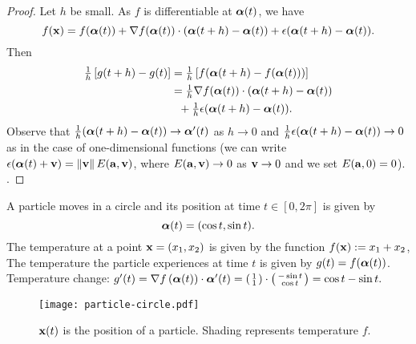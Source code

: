 \begin{proof}
    Let \(h\) be small. As $f$ is differentiable at $\aalpha(t)$,
    we have
    \[
     f(\xx) = f(\aalpha(t)) + \nabla f(\aalpha(t)) \cdot (\aalpha(t+h) - \aalpha(t)) + \epsilon(\aalpha(t+h)-\aalpha(t)).
    \]
    Then
    \[
        \begin{aligned}
            \tfrac{1}{h}\left[g(t+h)-g(t) \right]
             & = \tfrac{1}{h}\left[f(\aalpha(t+h)-f(\aalpha(t)))\right]                        \\
             & = \tfrac{1}{h} \nabla f(\aalpha(t))\cdot (\aalpha(t+h)-\aalpha(t))                  \\
             & \ \ +  \tfrac{1}{h}  \epsilon(\aalpha(t+h)-\aalpha(t)).
        \end{aligned}
    \]
    Observe that \(\tfrac{1}{h}  (\aalpha(t+h)-\aalpha(t)) \to \aalpha'(t)  \) as \(h\to 0\)
    and $\tfrac{1}{h}  \epsilon(\aalpha(t+h)-\aalpha(t)) \to 0$
    as in the case of one-dimensional functions
    (we can write $\epsilon(\aalpha(t)+\vv) = \norm{\vv}E(\aa, \vv)$,
    where $E(\aa, \vv) \to 0$ as $\vv \to 0$ and we set $E(\aa, 0) = 0$).
    .
\end{proof}


\begin{example*}
    A particle moves in a circle and its position at time \(t\in [0,2\pi]\) is given by
    \[
        \aalpha(t) = (\cos t, \sin t).
    \]
    The temperature at a point \(\xx=(x_1,x_2)\) is given by the function \(f(\xx) := x_1 + x_2\),
    The temperature the particle experiences at time \(t\) is given by \(g(t) = f (\aalpha(t))\).
    Temperature change:
    \(
    g'(t)
    = \nabla f \left(\aalpha(t)\right) \cdot \aalpha'(t)
    = \left(\begin{smallmatrix}
            1 \\
            1
        \end{smallmatrix}\right)
    \cdot
    \left( \begin{smallmatrix}
            -\sin t \\
            \cos t
        \end{smallmatrix}\right)
    = \cos t - \sin t.
    \)
\end{example*}

\begin{figure}
    \begin{center}
        \texttt{[image: particle-circle.pdf]}
        \caption{\(\xx(t)\) is the position of a particle. Shading represents temperature \(f\).}%
        \label{fig:particle-circle}
    \end{center}
\end{figure}


